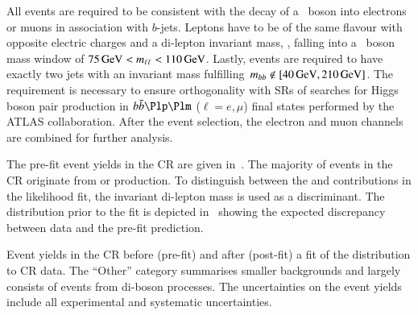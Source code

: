 All events are required to be consistent with the decay of a \PZ~boson into
electrons or muons in association with $b$-jets. Leptons have to be of the same
flavour with opposite electric charges and a di-lepton invariant mass, \mll, falling
into a \PZ~boson mass window of $\SI{75}{\ensuremath{\text{GeV}}} < m_{\ell\ell} < \SI{110}{\ensuremath{\text{GeV}}}$. Lastly,
events are required to have exactly two \btagged jets with an invariant mass
fulfilling~\mbox{$\mBB \not\in [\SI{40}{\GeV}, \SI{210}{\GeV}]$}. The \mBB
requirement is necessary to ensure orthogonality with SRs of searches for Higgs
boson pair production in $\bbbar\Plp\Plm$ ($\ell = e, \mu$) final states
performed by the ATLAS collaboration.
After the event selection, the electron and muon channels are combined for
further analysis.

The pre-fit event yields in the \ZHF CR are given in~. The
majority of events in the CR originate from \ZHF
or \ttbar production.
To distinguish between the \ZHF and \ttbar contributions in the likelihood fit,
the invariant di-lepton mass is used as a discriminant. The \mll distribution
prior to the fit is depicted in~ showing the expected
discrepancy between data and the pre-fit prediction.

\begin{table}[htbp]
  \centering

  \caption[Event yields in the \ZHF~CR before and after the fit to CR
  data]{Event yields in the \ZHF CR before (pre-fit) and after (post-fit) a fit
    of the \mll distribution to CR data. The ``Other'' category summarises
    smaller backgrounds and largely consists of events from di-boson
    processes. The uncertainties on the event yields include all experimental
    and systematic uncertainties.}%
  \label{tab:zcr_yields}

  
\end{table}

